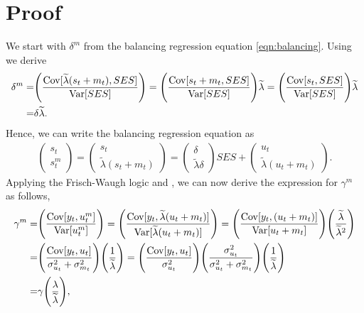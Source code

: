 \appendix

\section{\texorpdfstring{Proof }{proof}}\label{sec:proof_ols}

We start with $\delta^m$ from the balancing regression equation \eqref{eqn:balancing}. Using  we derive 
\begin{align}
    \delta^m=&\Bigg(\frac{\mathrm{Cov}[\widetilde{\lambda} (s_t+m_t), SES]}{\mathrm{Var}[SES]}\Bigg)= \Bigg(\frac{\mathrm{Cov}[ s_t+m_t, SES]} {\mathrm{Var}[SES]}\Bigg)\widetilde{\lambda} = \Bigg(\frac{\mathrm{Cov}[ s_t, SES]} {\mathrm{Var}[SES]}\Bigg) \widetilde{\lambda} \\ \notag
    =& \delta \widetilde{\lambda}. 
\end{align}
Hence, we can write the balancing regression equation as
\begin{align}
 \begin{pmatrix} s_t \\ s_{t}^m  \end{pmatrix}= \begin{pmatrix} s_t \\ \widetilde{\lambda} (s_t+m_t)  \end{pmatrix}= 
\begin{pmatrix} \delta \\ \widetilde{\lambda} \delta \end{pmatrix} SES +  \begin{pmatrix} u_{t} \\ \widetilde{\lambda}(u_{t}+m_t) \end{pmatrix}.
\end{align} 
Applying the Frisch-Waugh logic and , we can now derive the expression for $\gamma^m$ as follows,
\begin{align}
    \gamma^m=&\Bigg(\frac{\mathrm{Cov}[y_t,u^m_t]}{\mathrm{Var}[u^m_t]}\Bigg)=\Bigg(\frac{\mathrm{Cov}[y_t, \widetilde{\lambda}(u_{t}+m_t)]}{\mathrm{Var}[ \widetilde{\lambda}(u_{t}+m_t)]}\Bigg)=\Bigg(\frac{\mathrm{Cov}[y_t, (u_{t}+m_t)]}{\mathrm{Var}[ u_{t}+m_t]}\Bigg) \Bigg(\frac{\widetilde{\lambda}}{\widetilde{\lambda}^2}\Bigg) \\ \notag
    =& \Bigg(\frac{\mathrm{Cov}[y_t,u_{t}]}{\sigma_{u_{t}}^2+\sigma_{m_{t}}^2}\Bigg)\Bigg(\frac{1}{\widetilde{\lambda}}\Bigg)= \Bigg(\frac{\mathrm{Cov}[y_t,u_{t}]}{\sigma_{u_{t}}^2} \Bigg) \Bigg(\frac{\sigma_{u_{t}}^2}{\sigma_{u_{t}}^2+\sigma_{m_{t}}^2} \Bigg) \Bigg(\frac{1}{\widetilde{\lambda}}\Bigg) \\ \notag
    =&\gamma \Bigg(\frac{\lambda}{\widetilde{\lambda}}\Bigg), 
\end{align}
